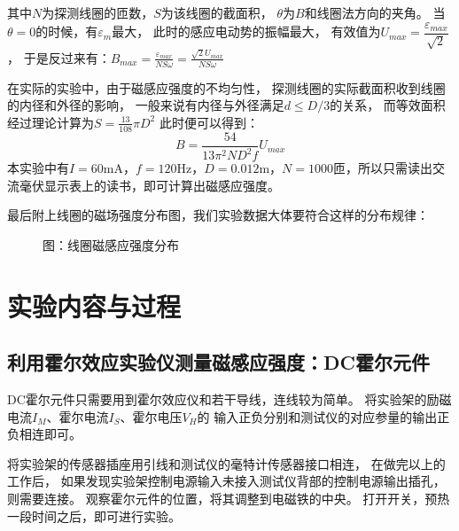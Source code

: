 \documentclass[11pt]{article}
\renewcommand{\emph}[1]{\begin{kaishu}#1\end{kaishu}}
\begin{document}
	其中$N$为探测线圈的匝数，$S$为该线圈的截面积，
	$\theta$为$B$和线圈法方向的夹角。
	当$\theta=0$的时候，有$\varepsilon_m$最大，
	此时的感应电动势的振幅最大，
	有效值为$U_{max}=\dfrac{\varepsilon_{max}}{\sqrt{2}}$，
	于是反过来有：$B_{max}=\frac{\varepsilon_{max}}{NS\omega}=\frac{\sqrt{2}U_{max}}{NS\omega}$
	
	在实际的实验中，由于磁感应强度的不均匀性，
	探测线圈的实际截面积收到线圈的内径和外径的影响，
	一般来说有内径与外径满足$d\leq D/3$的关系，
	而等效面积经过理论计算为$S=\frac{13}{108}\pi D^2$
	此时便可以得到：
	\begin{equation*}
		B=\frac{54}{13\pi^2ND^2f}U_{max}
	\end{equation*}
	本实验中有$I=60$mA，$f=120$Hz，$D=0.012$m，$N=1000$匝，所以只需读出交流毫伏显示表上的读书，即可计算出磁感应强度。

	最后附上线圈的磁场强度分布图，我们实验数据大体要符合这样的分布规律：
	\begin{figure}[h!]
		\centering
		\emph{}
		\hspace{0.5in}
		\emph{}
		\hspace{0.5in}
		\bf\emph{\caption*{图：线圈磁感应强度分布}}
	\end{figure}





















\section{实验内容与过程}


\subsection{利用霍尔效应实验仪测量磁感应强度：DC霍尔元件}
	DC霍尔元件只需要用到霍尔效应仪和若干导线，连线较为简单。
    将实验架的励磁电流$I_M$、霍尔电流$I_S$、霍尔电压$V_H$的
	输入正负分别和测试仪的对应参量的输出正负相连即可。

    将实验架的传感器插座用引线和测试仪的毫特计传感器接口相连，
	在做完以上的工作后，
    如果发现实验架控制电源输入未接入测试仪背部的控制电源输出插孔，
	则需要连接。
	观察霍尔元件的位置，将其调整到电磁铁的中央。
	打开开关，预热一段时间之后，即可进行实验。
	
\end{document}
